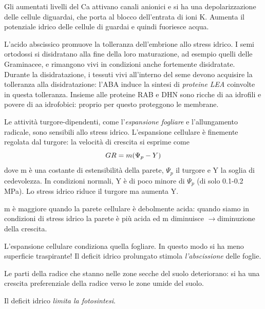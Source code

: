 \documentclass[a4paper,12pt]{book}
\newcommand{\lfreccia}{\ensuremath{\longrightarrow}}
\begin{document}
Gli aumentati livelli del Ca attivano canali anionici e si ha una depolarizzazione delle cellule diguardai, che porta al blocco dell'entrata di ioni K. Aumenta il potenziale idrico delle cellule di guardai e quindi fuoriesce acqua. 
 
L'acido abscissico promuove la tolleranza dell'embrione allo stress idrico. I semi ortodossi si disidratano alla fine della loro maturazione, ad esempio quelli delle Graminacee, e rimangono vivi in condizioni anche fortemente disidratate. Durante la disidratazione, i tessuti vivi all'interno del seme devono acquisire la tolleranza alla disidratazione: l'ABA induce la sintesi di \emph{proteine LEA} coinvolte in questa tolleranza. Insieme alle proteine RAB e DHN sono ricche di aa idrofili e povere di aa idrofobici: proprio per questo proteggono le membrane.

Le attività turgore-dipendenti, come l'\emph{espansione fogliare} e l'allungamento radicale, sono sensibili allo stress idrico. L'espansione cellulare è finemente regolata dal turgore: la velocità di crescita si esprime come
\begin{equation}
\centering
GR=m(\Psi_{p}-Y)
\end{equation}
dove m è una costante di estensibilità della parete, $\Psi_p$ il turgore e Y la soglia di cedevolezza. In condizioni normali, Y è di poco minore di $\Psi_{p}$ (di solo 0.1-0.2 MPa). Lo stress idrico riduce il turgore ma aumenta Y.

m è maggiore quando la parete cellulare è debolmente acida: quando siamo in condizioni di stress idrico la parete è più acida ed m diminuisce \lfreccia diminuzione della crescita.

L'espansione cellulare condiziona quella fogliare. In questo modo si ha meno superficie traspirante! Il deficit idrico prolungato stimola \emph{l'abscissione} delle foglie.

Le parti della radice che stanno nelle zone secche del suolo deteriorano: si ha una crescita preferenziale della radice verso le zone umide del suolo.

Il deficit idrico \emph{limita la fotosintesi}. 
\end{document}

